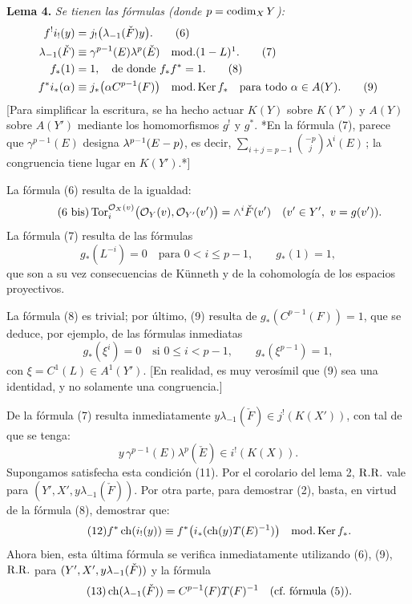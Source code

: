 \textbf{Lema 4.} \emph{Se tienen las fórmulas (donde \(p=\codim_XY\)):}
\begin{align}
  f^!i_!(y)&=j_!\bigl(\lambda_{-1}(\check F)y\bigr). \tag{6}\\
  \lambda_{-1}(\check F)&\equiv \gamma^{p-1}(E)\lambda^p(\check E)
    \quad\text{mod.}(1-L)\footnotemark. \tag{7}\\
  f_*(1)&=1,\quad\text{de donde }f_*f^*=1. \tag{8}\\
  f^*i_*(\alpha)&\equiv j_*\bigl(\alpha C^{p-1}(F)\bigr)
    \quad\text{mod.}\Ker f_*\quad\text{para todo }\alpha\in A(Y). \tag{9}
\end{align}
[Para simplificar la escritura, se ha hecho actuar \(K(Y)\) sobre \(K(Y')\) y \(A(Y)\) sobre \(A(Y')\) mediante los homomorfismos \(g^!\) y \(g^*\). {*}En la fórmula (7), parece que \(\gamma^{p-1}(E)\) designa \(\lambda^{p-1}(\sisi{E-2}{E-p})\), es decir, \(\sum_{i+j=p-1}\binom{-p}{j}\lambda^i(E)\)\,; la congruencia tiene lugar en \(K(Y')\).{*}]

La fórmula (6) resulta de la igualdad:
\begin{equation}\tag{6 bis}
  \Tor_i^{\mathcal O_X(v)}\bigl(\mathcal O_Y(v),\mathcal O_{Y'}(v')\bigr)
  =
  \wedge^i\check F(v')
  \quad (v'\in Y',\ v=g(v')).
\end{equation}
La fórmula (7) resulta de las fórmulas
\begin{equation}\tag{10}
  g_*(L^{-i})=0\quad\text{para }0<i\leq p-1,\qquad g_*(1)=1,
\end{equation}
que son a su vez consecuencias de Künneth y de la cohomología de los espacios proyectivos.

La fórmula (8) es trivial; por último, (9) resulta de \(g_*(C^{p-1}(F))=1\), que se deduce, por ejemplo, de las fórmulas inmediatas
\begin{equation}\tag{10 bis}
  g_*(\xi^i)=0\quad\text{si }0\leq i<p-1,\qquad
  g_*(\xi^{p-1})=1,
\end{equation}
con \(\xi=C^1(L)\in A^1(Y')\). [En realidad, es muy verosímil que (9) sea una identidad, y no solamente una congruencia.]

De la fórmula (7) resulta inmediatamente \(y\lambda_{-1}(\check F)\in j^!(K(X'))\), con tal de que se tenga:
\begin{equation}\tag{11}
  y\,\gamma^{p-1}(E)\lambda^p(\check E)\in i^!(K(X)).
\end{equation}
Supongamos satisfecha esta condición (11). Por el corolario del lema 2, \(\RR\) vale para \((Y',X',y\lambda_{-1}(\check F))\). Por otra parte, para demostrar (2), basta, en virtud de la fórmula (8), demostrar que:
\begin{equation}\tag{12}
  f^*\ch(i_!(y))
  \equiv
  f^*\bigl(i_*(\ch(y)T(E)^{-1})\bigr)
  \quad\text{mod.}\Ker f_*.
\end{equation}
Ahora bien, esta última fórmula se verifica inmediatamente utilizando (6), (9), \(\RR\) para \((Y',X',y\lambda_{-1}(\sisi{F}{\check F}))\) y la fórmula
\begin{equation}\tag{13}
  \ch(\lambda_{-1}(\check F))=C^{p-1}(F)T(F)^{-1}\quad\text{(cf.\ fórmula (5)).}
\end{equation}

